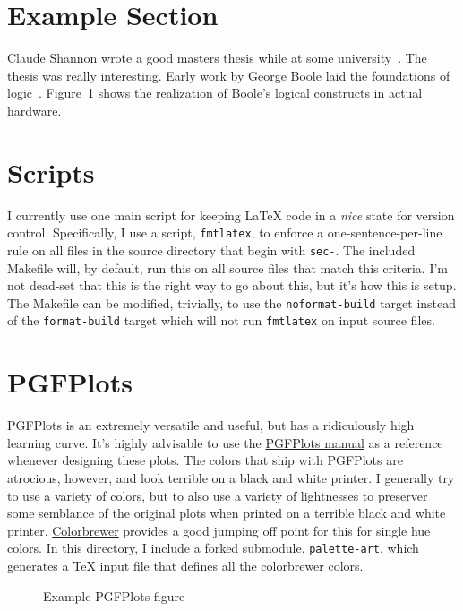 \maketitle

\begin{abstract}
  Basic document that demonstrates the {\LaTeX} build flow that I use as well as several quirks regarding specific packages.
\end{abstract}

\section{Example Section}
Claude Shannon wrote a good masters thesis while at some university~\cite{shannon1938}.
The thesis was really interesting.
Early work by George Boole laid the foundations of logic~\missingcitation.
Figure~\ref{fig-shannon} shows the realization of Boole's logical constructs in actual hardware.

\begin{figure}[h]
  \caption{}
  \label{fig-shannon}
\end{figure}

\section{Scripts}
I currently use one main script for keeping {\LaTeX} code in a \emph{nice} state for version control.
Specifically, I use a script, \texttt{fmtlatex}, to enforce a one-sentence-per-line rule on all files in the source directory that begin with \texttt{sec-}.
The included Makefile will, by default, run this on all source files that match this criteria.
I'm not dead-set that this is the right way to go about this, but it's how this is setup.
The Makefile can be modified, trivially, to use the \texttt{noformat-build} target instead of the \texttt{format-build} target which will not run \texttt{fmtlatex} on input source files.

\section{PGFPlots}
PGFPlots is an extremely versatile and useful, but has a ridiculously high learning curve.
It's highly advisable to use the \href{http://mirrors.ctan.org/graphics/pgf/contrib/pgfplots/doc/pgfplots.pdf}{PGFPlots manual} as a reference whenever designing these plots.
The colors that ship with PGFPlots are atrocious, however, and look terrible on a black and white printer.
I generally try to use a variety of colors, but to also use a variety of lightnesses to preserver some semblance of the original plots when printed on a terrible black and white printer.
\href{http://colorbrewer2.org/}{Colorbrewer} provides a good jumping off point for this for single hue colors.
In this directory, I include a forked submodule, \texttt{palette-art}, which generates a {\TeX} input file that defines all the colorbrewer colors.

\begin{figure}[h]
  \centering 
  \caption{Example PGFPlots figure}
\end{figure}
